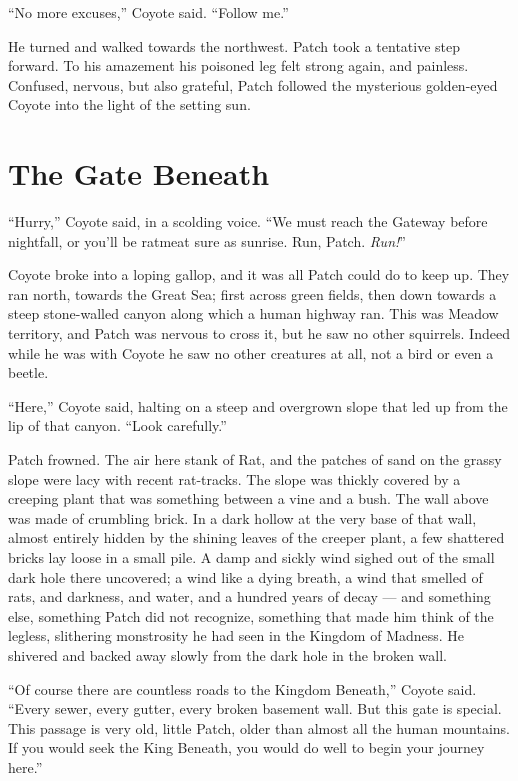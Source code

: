 \documentclass[ebook,oneside,openany,12pt]{memoir}
\begin{document}
“No more excuses,” Coyote said. “Follow me.”

He turned and walked towards the northwest. Patch took a tentative
step forward. To his amazement his poisoned leg felt strong again, and
painless. Confused, nervous, but also grateful, Patch followed the
mysterious golden-eyed Coyote into the light of the setting sun.


\section{The Gate Beneath}

“Hurry,” Coyote said, in a scolding voice. “We must reach the Gateway
before nightfall, or you’ll be ratmeat sure as sunrise. Run,
Patch. \emph{Run!}”

Coyote broke into a loping gallop, and it was all Patch could do to
keep up. They ran north, towards the Great Sea; first across green
fields, then down towards a steep stone-walled canyon along which a
human highway ran. This was Meadow territory, and Patch was nervous to
cross it, but he saw no other squirrels. Indeed while he was with
Coyote he saw no other creatures at all, not a bird or even a beetle.

“Here,” Coyote said, halting on a steep and overgrown slope that led
up from the lip of that canyon. “Look carefully.”

Patch frowned. The air here stank of Rat, and the patches of sand on
the grassy slope were lacy with recent rat-tracks. The slope was
thickly covered by a creeping plant that was something between a vine
and a bush. The wall above was made of crumbling brick. In a dark
hollow at the very base of that wall, almost entirely hidden by the
shining leaves of the creeper plant, a few shattered bricks lay loose
in a small pile. A damp and sickly wind sighed out of the small dark
hole there uncovered; a wind like a dying breath, a wind that smelled
of rats, and darkness, and water, and a hundred years of decay — and
something else, something Patch did not recognize, something that made
him think of the legless, slithering monstrosity he had seen in the
Kingdom of Madness. He shivered and backed away slowly from the dark
hole in the broken wall.

“Of course there are countless roads to the Kingdom Beneath,” Coyote
said. “Every sewer, every gutter, every broken basement wall. But this
gate is special. This passage is very old, little Patch, older than
almost all the human mountains. If you would seek the King Beneath,
you would do well to begin your journey here.”
\end{document}

